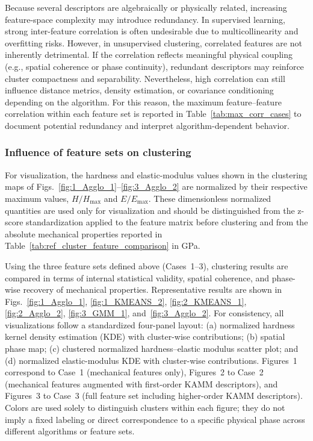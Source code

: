 \documentclass[final,3p,times]{elsarticle}
\begin{document}
Because several descriptors are algebraically or physically related, increasing feature-space complexity may introduce redundancy. In supervised learning, strong inter-feature correlation is often undesirable due to multicollinearity and overfitting risks. However, in unsupervised clustering, correlated features are not inherently detrimental. If the correlation reflects meaningful physical coupling (e.g., spatial coherence or phase continuity), redundant descriptors may reinforce cluster compactness and separability. Nevertheless, high correlation can still influence distance metrics, density estimation, or covariance conditioning depending on the algorithm. For this reason, the maximum feature--feature correlation within each feature set is reported in Table~\ref{tab:max_corr_cases} to document potential redundancy and interpret algorithm-dependent behavior.

\subsubsection{Influence of feature sets on clustering}
\label{sec:nisiC_feature_sets}

For visualization, the hardness and elastic-modulus values shown in the clustering maps of Figs.~\ref{fig:1_Agglo_1}--\ref{fig:3_Agglo_2} are normalized by their respective maximum values, $H/H_{\max}$ and $E/E_{\max}$. These dimensionless normalized quantities are used only for visualization and should be distinguished from the z-score standardization applied to the feature matrix before clustering and from the absolute mechanical properties reported in Table~\ref{tab:ref_cluster_feature_comparison} in GPa.

Using the three feature sets defined above (Cases~1--3), clustering results are compared in terms of internal statistical validity, spatial coherence, and phase-wise recovery of mechanical properties. Representative results are shown in Figs.~\ref{fig:1_Agglo_1}, \ref{fig:1_KMEANS_2}, \ref{fig:2_KMEANS_1}, \ref{fig:2_Agglo_2}, \ref{fig:3_GMM_1}, and~\ref{fig:3_Agglo_2}. For consistency, all visualizations follow a standardized four-panel layout: (a) normalized hardness kernel density estimation (KDE) with cluster-wise contributions; (b) spatial phase map; (c) clustered normalized hardness--elastic modulus scatter plot; and (d) normalized elastic-modulus KDE with cluster-wise contributions. Figures~1 correspond to Case~1 (mechanical features only), Figures~2 to Case~2 (mechanical features augmented with first-order KAMM descriptors), and Figures~3 to Case~3 (full feature set including higher-order KAMM descriptors). Colors are used solely to distinguish clusters within each figure; they do not imply a fixed labeling or direct correspondence to a specific physical phase across different algorithms or feature sets.
\end{document}
